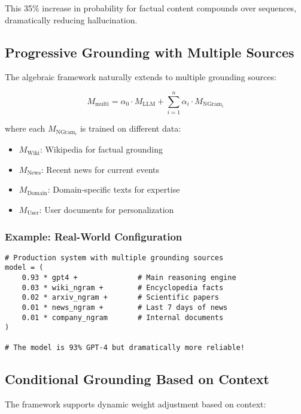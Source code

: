 \documentclass{article}
\theoremstyle{definition}
\begin{document}
This 35\% increase in probability for factual content compounds over sequences, dramatically reducing hallucination.

\subsection{Progressive Grounding with Multiple Sources}

The algebraic framework naturally extends to multiple grounding sources:

\begin{equation}
M_{\text{multi}} = \alpha_0 \cdot M_{\text{LLM}} + \sum_{i=1}^n \alpha_i \cdot M_{\text{NGram}_i}
\end{equation}

where each $M_{\text{NGram}_i}$ is trained on different data:
\begin{itemize}
    \item $M_{\text{Wiki}}$: Wikipedia for factual grounding
    \item $M_{\text{News}}$: Recent news for current events
    \item $M_{\text{Domain}}$: Domain-specific texts for expertise
    \item $M_{\text{User}}$: User documents for personalization
\end{itemize}

\subsubsection{Example: Real-World Configuration}

\begin{lstlisting}
# Production system with multiple grounding sources
model = (
    0.93 * gpt4 +              # Main reasoning engine
    0.03 * wiki_ngram +        # Encyclopedia facts
    0.02 * arxiv_ngram +       # Scientific papers
    0.01 * news_ngram +        # Last 7 days of news
    0.01 * company_ngram       # Internal documents
)

# The model is 93% GPT-4 but dramatically more reliable!
\end{lstlisting}

\subsection{Conditional Grounding Based on Context}

The framework supports dynamic weight adjustment based on context:
\end{document}
